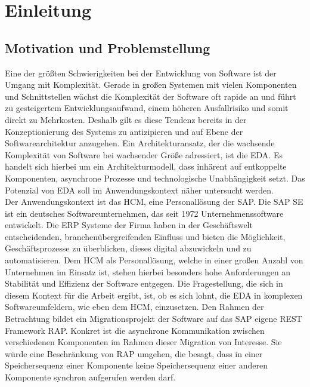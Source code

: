 \section{Einleitung}
\subsection{Motivation und Problemstellung}
Eine der größten Schwierigkeiten bei der Entwicklung von Software ist der Umgang mit Komplexität. Gerade in großen Systemen mit vielen Komponenten und Schnittstellen wächst die Komplexität der Software oft rapide an und führt zu gesteigertem Entwicklungsaufwand, einem höheren Ausfallrisiko und somit direkt zu Mehrkosten. Deshalb gilt es diese Tendenz bereits in der Konzeptionierung des Systems zu antizipieren und auf Ebene der Softwarearchitektur anzugehen. Ein Architekturansatz, der die wachsende Komplexität von Software bei wachsender Größe adressiert, ist die EDA. Es handelt sich hierbei um ein Architekturmodell, dass inhärent auf entkoppelte Komponenten, asynchrone Prozesse und technologische Unabhängigkeit setzt. Das Potenzial von \ac{EDA} soll im Anwendungskontext näher untersucht werden. \\ Der Anwendungskontext ist das HCM, eine Personallösung der SAP. Die SAP SE ist ein deutsches Softwareunternehmen, das seit 1972 Unternehmenssoftware entwickelt. Die \ac{ERP} Systeme der Firma haben in der Geschäftswelt entscheidenden, branchenübergreifenden Einfluss und bieten die Möglichkeit, Geschäftsprozesse zu überblicken, dieses digital abzuwickeln und zu automatisieren. \cite[Vgl.][]{sapse_was} Dem \ac{HCM} als Personallösung, welche in einer großen Anzahl von Unternehmen im Einsatz ist, stehen hierbei besonders hohe Anforderungen an Stabilität und Effizienz der Software entgegen. Die Fragestellung, die sich in diesem Kontext für die Arbeit ergibt, ist, ob es sich lohnt, die \ac{EDA} in komplexen Softwareumfeldern, wie eben dem \ac{HCM}, einzusetzen.
Den Rahmen der Betrachtung bildet ein Migrationsprojekt der Software auf das SAP eigene REST Framework RAP. Konkret ist die asynchrone Kommunikation zwischen verschiedenen Komponenten im Rahmen dieser Migration von Interesse. Sie würde eine Beschränkung von RAP umgehen, die besagt, dass in einer Speichersequenz einer Komponente keine Speichersequenz einer anderen Komponente synchron aufgerufen werden darf.

